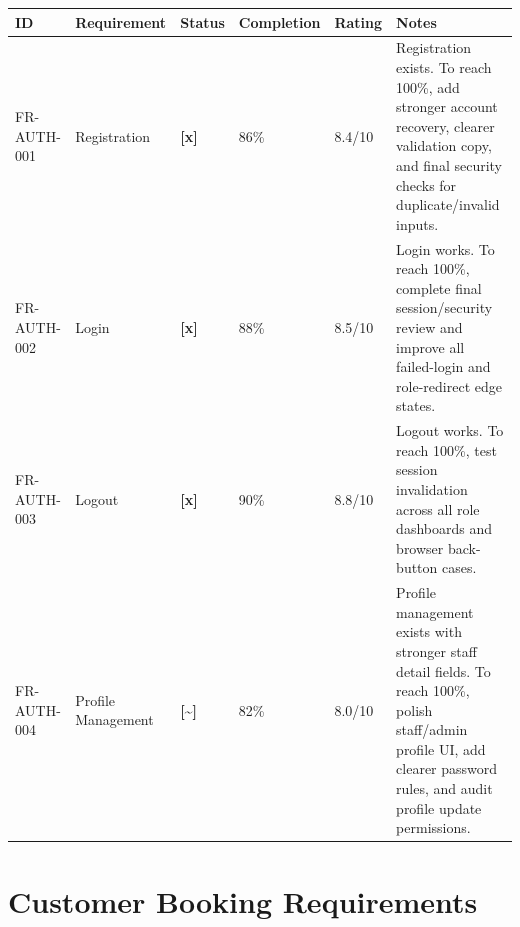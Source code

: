 \documentclass[11pt,a4paper]{article}
\newcommand{\statusdone}{\textbf{[x]}}
\newcommand{\statuspartial}{\textbf{[{\textasciitilde}]}}
\begin{document}
\begin{longtable}{L{0.15\textwidth} L{0.22\textwidth} C{0.08\textwidth} C{0.10\textwidth} C{0.10\textwidth} L{0.25\textwidth}}
\toprule
\textbf{ID} & \textbf{Requirement} & \textbf{Status} & \textbf{Completion} & \textbf{Rating} & \textbf{Notes} \\
\midrule
FR-AUTH-001 & Registration & \statusdone & 86\% & 8.4/10 & Registration exists. To reach 100\%, add stronger account recovery, clearer validation copy, and final security checks for duplicate/invalid inputs. \\
FR-AUTH-002 & Login & \statusdone & 88\% & 8.5/10 & Login works. To reach 100\%, complete final session/security review and improve all failed-login and role-redirect edge states. \\
FR-AUTH-003 & Logout & \statusdone & 90\% & 8.8/10 & Logout works. To reach 100\%, test session invalidation across all role dashboards and browser back-button cases. \\
FR-AUTH-004 & Profile Management & \statuspartial & 82\% & 8.0/10 & Profile management exists with stronger staff detail fields. To reach 100\%, polish staff/admin profile UI, add clearer password rules, and audit profile update permissions. \\
\bottomrule
\end{longtable}

\section{Customer Booking Requirements}
\end{document}
